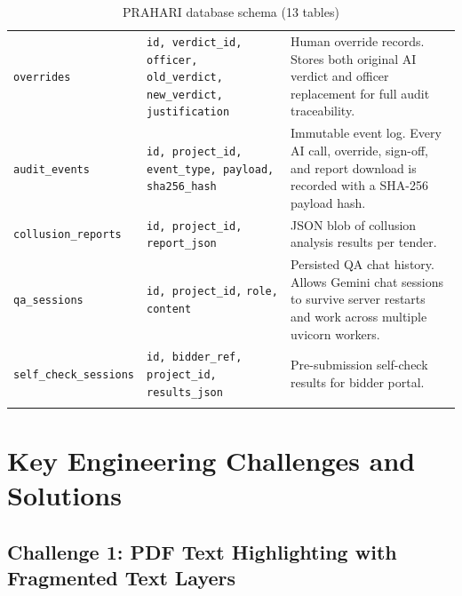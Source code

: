 \documentclass[12pt,a4paper]{article}
\begin{document}
\begin{longtable}{@{}p{3.2cm}p{2.8cm}p{6.5cm}@{}}
\texttt{overrides} &
    \texttt{id, verdict\_id,} \newline \texttt{officer, old\_verdict,} \newline
    \texttt{new\_verdict, justification} &
    Human override records. Stores both original AI verdict and
    officer replacement for full audit traceability. \\[6pt]

\texttt{audit\_events} &
    \texttt{id, project\_id,} \newline \texttt{event\_type, payload,} \newline
    \texttt{sha256\_hash} &
    Immutable event log. Every AI call, override, sign-off, and
    report download is recorded with a SHA-256 payload hash. \\[6pt]

\texttt{collusion\_reports} &
    \texttt{id, project\_id,} \newline \texttt{report\_json} &
    JSON blob of collusion analysis results per tender. \\[6pt]

\texttt{qa\_sessions} &
    \texttt{id, project\_id,} \newline \texttt{role, content} &
    Persisted QA chat history. Allows Gemini chat sessions to survive
    server restarts and work across multiple uvicorn workers. \\[6pt]

\texttt{self\_check\_sessions} &
    \texttt{id, bidder\_ref,} \newline \texttt{project\_id, results\_json} &
    Pre-submission self-check results for bidder portal. \\[6pt]

\bottomrule
\caption{PRAHARI database schema (13 tables)}
\end{longtable}

\section{Key Engineering Challenges and Solutions}

\subsection{Challenge 1: PDF Text Highlighting with Fragmented Text Layers}
\end{document}

